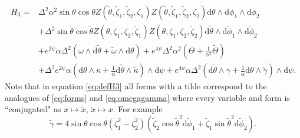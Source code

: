 \documentclass[a4paper, 11pt]{article}
\numberwithin{equation}{section}
\newcommand{\+}{\oplus}
\renewcommand{\d}{\ensuremath{\mathrm{d}}\xspace}
\newcommand{\CE}[1]{\textcolor{darkorange}{#1}}
\begin{document}
\begin{equation}\label{eq:defH3}
	\begin{split}
		H_3=&\Delta^2\alpha^2\sin\theta \cos \theta Z(\tilde \theta,\tilde{\zeta}_1,\tilde{\zeta}_2,\zeta_1) Z(\tilde \theta,\tilde{\zeta}_1,\tilde{\zeta}_2,\zeta_2)\d \theta\wedge\d\phi_1\wedge\d\phi _2\\
		&+\Delta^2\sin\tilde\theta \cos \tilde\theta Z(\theta,\zeta_1,\zeta_2,\tilde{\zeta}_1) Z( \theta,\zeta_1,\zeta_2,\tilde{\zeta}_2)\d \tilde\theta\wedge\d\tilde{\phi}_1\wedge\d\tilde{\phi} _2\\
		&+e^{2\psi}\alpha\Delta^2\left(\omega\wedge\d \tilde\theta+\tilde\omega\wedge\d \theta\right)+e^{4\psi}\Delta^2\alpha ^2\left(\Theta +\frac 1{\alpha^2}\tilde \Theta \right)\\
		&+\Delta^2e^{2\psi}\alpha\left(\d \theta\wedge \kappa +\frac 1{\alpha}\d \tilde \theta \wedge \tilde \kappa\right)\wedge\d\psi+e^{4\psi}\alpha\Delta^2\left(\d\tilde \theta \wedge \gamma +\frac 1{\alpha}\d \theta\wedge\tilde\gamma\right)\wedge\d\psi.
	\end{split}
\end{equation}
Note that in equation \eqref{eq:defH3} all forms with a tilde correspond to the analogues of \eqref{eq:forms} and \eqref{eq:omegagamma} where every variable and form is ``conjugated" as $x\mapsto\tilde x$, $\tilde x\mapsto x$. For example 
\begin{equation}
	\tilde\gamma=4\sin\theta\cos\theta(\zeta_1^2-\zeta_2 ^2)\left(\tilde{\zeta}_2\cos\tilde \theta ^2\d \tilde \phi _1+\tilde{\zeta} _1\sin\tilde\theta ^2\d\tilde\phi _2\right).
\end{equation} 
\end{document}
